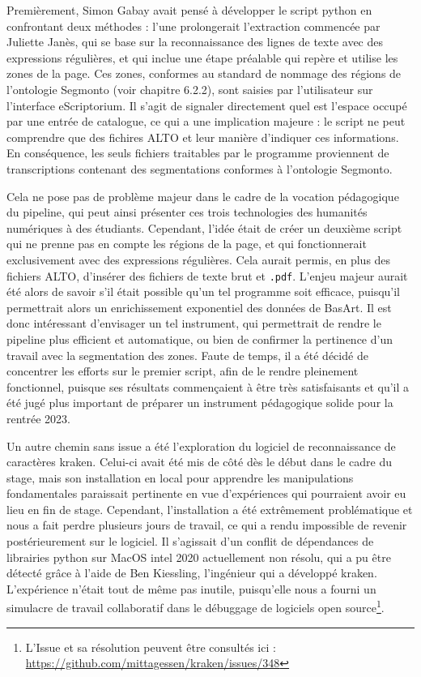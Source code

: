 \documentclass[a4paper,12pt,twoside]{book}
\begin{document}
Premièrement, Simon Gabay avait pensé à développer le script python en confrontant deux méthodes : l'une prolongerait l'extraction commencée par Juliette Janès, qui se base sur la reconnaissance des lignes de texte avec des expressions régulières, et qui inclue une étape préalable qui repère et utilise les zones de la page. Ces zones, conformes au standard de nommage des régions de l'ontologie Segmonto (voir chapitre 6.2.2), sont saisies par l'utilisateur sur l'interface eScriptorium. Il s'agit de signaler directement quel est l'espace occupé par une entrée de catalogue, ce qui a une implication majeure : le script ne peut comprendre que des fichires ALTO et leur manière d'indiquer ces informations. En conséquence, les seuls fichiers traitables par le programme proviennent de transcriptions contenant des segmentations conformes à l'ontologie Segmonto.

Cela ne pose pas de problème majeur dans le cadre de la vocation pédagogique du pipeline, qui peut ainsi présenter ces trois technologies des humanités numériques à des étudiants. Cependant, l'idée était de créer un deuxième script qui ne prenne pas en compte les régions de la page, et qui fonctionnerait exclusivement avec des expressions régulières. Cela aurait permis, en plus des fichiers ALTO, d'insérer des fichiers de texte brut et \texttt{.pdf}. L'enjeu majeur aurait été alors de savoir s'il était possible qu'un tel programme soit efficace, puisqu'il permettrait alors un enrichissement exponentiel des données de BasArt. Il est donc intéressant d'envisager un tel instrument, qui permettrait de rendre le pipeline plus efficient et automatique, ou bien de confirmer la pertinence d'un travail avec la segmentation des zones. Faute de temps, il a été décidé de concentrer les efforts sur le premier script, afin de le rendre pleinement fonctionnel, puisque ses résultats commençaient à être très satisfaisants et qu'il a été jugé plus important de préparer un instrument pédagogique solide pour la rentrée 2023.

Un autre chemin sans issue a été l'exploration du logiciel de reconnaissance de caractères kraken. Celui-ci avait été mis de côté dès le début dans le cadre du stage, mais son installation en local pour apprendre les manipulations fondamentales paraissait pertinente en vue d'expériences qui pourraient avoir eu lieu en fin de stage. Cependant, l'installation a été extrêmement problématique et nous a fait perdre plusieurs jours de travail, ce qui a rendu impossible de revenir postérieurement sur le logiciel. Il s'agissait d'un conflit de dépendances de librairies python sur MacOS intel 2020 actuellement non résolu, qui a pu être détecté grâce à l'aide de Ben Kiessling, l'ingénieur qui a développé kraken. L'expérience n'était tout de même pas inutile, puisqu'elle nous a fourni un simulacre de travail collaboratif dans le débuggage de logiciels open source\footnote{L'Issue et sa résolution peuvent être consultés ici : \url{https://github.com/mittagessen/kraken/issues/348}}. 
\end{document}
